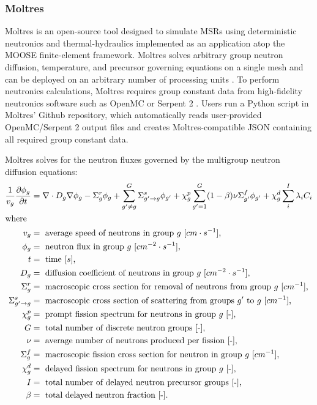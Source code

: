 \subsubsection{Moltres}
Moltres is an open-source tool designed to simulate \glspl{MSR} using 
deterministic neutronics and thermal-hydraulics implemented as an application 
atop the \gls{MOOSE} finite-element framework.  
Moltres solves arbitrary group neutron diffusion, temperature, and precursor 
governing equations on a single mesh and can be deployed on an arbitrary number 
of processing units \cite{lindsay_introduction_2018, park_advancement_2020}.
To perform neutronics calculations, Moltres requires group constant data from 
high-fidelity neutronics software such as OpenMC \cite{romano_openmc:_2015} or 
Serpent 2 \cite{leppanen_serpent_2014}. 
Users run a Python script in Moltres' Github repository, which automatically reads
user-provided OpenMC/Serpent 2 output files and creates Moltres-compatible JSON 
containing all required group constant data.

Moltres solves for the neutron fluxes governed by the multigroup neutron diffusion 
equations:
\begin{align}
    \label{eq:moltres-diffusion-equation}
    \frac{1}{v_g} \frac{\partial \phi_g}{\partial t} &= \nabla \cdot D_g
    \nabla \phi_g - \Sigma^r_g \phi_g +
    \sum^G_{g' \neq g} \Sigma^s_{g' \rightarrow g} \phi_{g'} + \chi^p_g
    \sum^G_{g'=1} (1-\beta) \nu \Sigma^f_{g'} \phi_{g'} + \chi^d_g \sum^I_i
    \lambda_i C_i \\
    \intertext{where}
    v_g &= \text{ average speed of neutrons in group $g$ [$cm \cdot s^{-1}$],} \nonumber \\
    \phi_g &= \text{ neutron flux in group $g$ [$cm^{-2} \cdot s^{-1}$],}\nonumber \\
    t &= \text{ time $[s]$,} \nonumber \\
    D_g &= \text{ diffusion coefficient of neutrons in group $g$ [$cm^{-2} \cdot s^{-1}$],} \nonumber \\
    \Sigma^r_g &= \text{ macroscopic cross section for removal of neutrons from group $g$ [$cm^{-1}$],} \nonumber \\
    \Sigma^s_{g' \rightarrow g} &= \text{ macroscopic cross section of scattering from groups $g'$ to $g$ [$cm^{-1}$],} \nonumber \\
    \chi^p_g &= \text{ prompt fission spectrum for neutrons in group $g$ [-],} \nonumber \\
    G &= \text{ total number of discrete neutron groups [-],} \nonumber \\
    \nu &= \text{ average number of neutrons produced per fission [-],} \nonumber \\
    \Sigma^f_{g} &= \text{ macroscopic fission cross section for neutron in group $g$ [$cm^{-1}$],} \nonumber \\
    \chi^d_g &= \text{ delayed fission spectrum for neutrons in group $g$ [-],} \nonumber \\
    I &= \text{ total number of delayed neutron precursor groups [-],} \nonumber \\
    \beta &= \text{ total delayed neutron fraction [-].} \nonumber
\end{align} 


